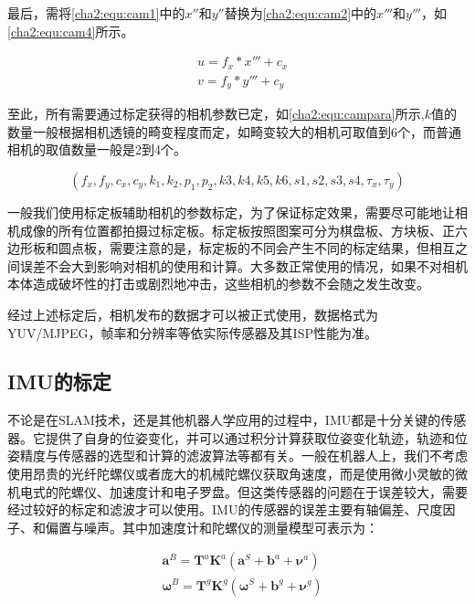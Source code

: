 最后，需将\ref{cha2:equ:cam1}中的$x''$和$y''$替换为\ref{cha2:equ:cam2}中的$x'''$和$y'''$，如\ref{cha2:equ:cam4}所示。

\begin{equation}
\label{cha2:equ:cam4}
\begin{aligned}
  &u = f_x * x''' + c_x\\
  &v = f_y * y''' + c_y
\end{aligned}
\end{equation}

至此，所有需要通过标定获得的相机参数已定，如\ref{cha2:equ:campara}所示,$k$值的数量一般根据相机透镜的畸变程度而定，如畸变较大的相机可取值到6个，而普通相机的取值数量一般是2到4个。

\begin{equation}
\label{cha2:equ:campara}
  (f_x,f_y,c_x,c_y,k_1,k_2,p_1,p_2,k3,k4,k5,k6,s1,s2,s3,s4,\tau_x,\tau_y)
\end{equation}

一般我们使用标定板辅助相机的参数标定，为了保证标定效果，需要尽可能地让相机成像的所有位置都拍摄过标定板。标定板按照图案可分为棋盘板、方块板、正六边形板和圆点板，需要注意的是，标定板的不同会产生不同的标定结果，但相互之间误差不会大到影响对相机的使用和计算。大多数正常使用的情况，如果不对相机本体造成破坏性的打击或剧烈地冲击，这些相机的参数不会随之发生改变。

经过上述标定后，相机发布的数据才可以被正式使用，数据格式为YUV/MJPEG，帧率和分辨率等依实际传感器及其ISP性能为准。

\subsection{IMU的标定}
\label{imu_calib}
不论是在SLAM技术，还是其他机器人学应用的过程中，IMU都是十分关键的传感器。它提供了自身的位姿变化，并可以通过积分计算获取位姿变化轨迹，轨迹和位姿精度与传感器的选型和计算的滤波算法等都有关。一般在机器人上，我们不考虑使用昂贵的光纤陀螺仪或者庞大的机械陀螺仪获取角速度，而是使用微小灵敏的微机电式的陀螺仪、加速度计和电子罗盘。但这类传感器的问题在于误差较大，需要经过较好的标定和滤波才可以使用。IMU的传感器的误差主要有轴偏差、尺度因子、和偏置与噪声\cite{tedaldi2014robust}。其中加速度计和陀螺仪的测量模型可表示为：

\begin{equation}
  \begin{aligned}
    &\mathbf{a}^{B} = \mathbf{T}^{a}\mathbf{K}^{a}(\mathbf{a}^{S}+\mathbf{b}^{a}+\mathbf{\nu}^{a})\\
    &\mathbf{\omega}^{B} = \mathbf{T}^{g}\mathbf{K}^{g}(\mathbf{\omega}^{S}+\mathbf{b}^{g}+\mathbf{\nu}^{g})
  \end{aligned}
\end{equation}

